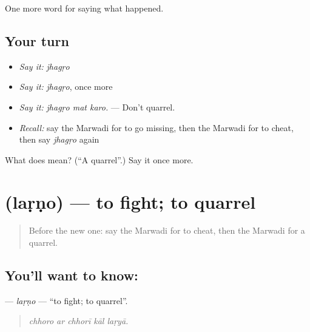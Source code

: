\begin{grammarlens}[title={What you've built}]
One more word for saying what happened.
\end{grammarlens}

\subsection*{Your turn}
\begin{itemize}
\raggedright
  \item \emph{Say it:} \emph{jhagṛo}
  \item \emph{Say it:} \emph{jhagṛo}, once more
  \item \emph{Say it:} \emph{jhagṛo mat karo.} — Don't quarrel.
  \item \emph{Recall:} say the Marwadi for to go missing, then the Marwadi for to cheat, then say \emph{jhagṛo} again
\end{itemize}

\begin{tcolorbox}[breakable,colback=teal!4,colframe=teal!35!black,title={Before you move on}]
What does  mean? (\textquotedblleft{}A quarrel\textquotedblright{}.) Say it once more.
\end{tcolorbox}
\section[\texorpdfstring{\mw{लड़णो} (laṛṇo)}{लड़णो (laṛṇo)}]{ (laṛṇo) — to fight; to quarrel}

\label{lesson:MW-C244-larno}



\begin{quote}
Before the new one: say the Marwadi for to cheat, then the Marwadi for a quarrel.
\end{quote}

\subsection*{You'll want to know: }
\textbf{} — \emph{laṛṇo} — \textquotedblleft{}to fight; to quarrel\textquotedblright{}.

\begin{quote}
    
\end{quote}

\begin{quote}
\emph{chhoro ar chhorī kāl laṛyā.}
\end{quote}

